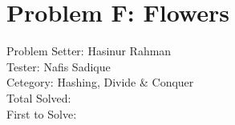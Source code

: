 \section*{Problem F: Flowers}
Problem Setter: Hasinur Rahman \\
Tester: Nafis Sadique \\
Cetegory: Hashing, Divide \& Conquer \\
Total Solved:  \\
First to Solve: \\
